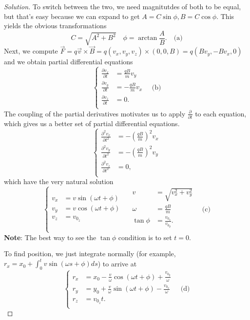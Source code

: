 \documentclass{article}
\begin{document}
\begin{proof}[Solution]
To switch between the two, we need magnitutdes of both to be equal, but
that's easy because we can expand to get $A = C\sin\phi, B = C\cos\phi$.
This yields the obvious transformations
\[\boxed{C = \sqrt{A^2 + B^2} \quad \phi = \arctan \frac{A}{B}.} \quad
\textrm{(a)} \]
Next, we compute $\vec{F} = q\vec{v} \times \vec{B} = q(v_x, v_y, v_z)
\times (0, 0, B) = q(Bv_y, -Bv_x, 0)$ and we obtain partial differential
equations
\[ \boxed{\left\lbrace \begin{aligned}
\frac{\partial v_x}{\partial t} &= \frac{qB}{m} v_y \\
\frac{\partial v_y}{\partial t} &= -\frac{qB}{m} v_x \\
\frac{\partial v_z}{\partial t} &= 0. \\
\end{aligned}\right.} \quad \textrm{(b)} \]
The coupling of the partial derivatives motivates us to apply
$\frac{\partial}{\partial t}$ to each equation, which gives us a better
set of partial differential equations.
\[ \left\lbrace \begin{aligned}
\frac{\partial^2 v_x}{\partial t^2} &= -\left(\frac{qB}{m}\right)^2 v_x
\\
\frac{\partial^2 v_y}{\partial t^2} &= -\left(\frac{qB}{m}\right)^2 v_y
\\
\frac{\partial^2 v_z}{\partial t^2} &= 0, \\
\end{aligned} \right. \]
which have the very natural solution
\[ \boxed{\left\lbrace \begin{aligned}
v_x       &= v \sin(\omega t + \phi) \\
v_y       &= v \cos(\omega t + \phi) \\
v_z       &= v_{0_z} \\
\end{aligned} \quad \begin{aligned}
v         &= \sqrt{v_x^2 + v_y^2} \\
\omega    &= \frac{qB}{m} \\
\tan \phi &= \frac{v_{0_x}}{v_{0_y}}. \\
\end{aligned} \right.} \quad \textrm{(c)} \]
\textbf{Note}: The best way to see the $\tan \phi$ condition is to set
$t = 0$.

To find position, we just integrate normally (for example, $r_x = x_0 +
\int_0^t v \sin(\omega s + \phi) ds$) to arrive at
\[ \boxed{\left\lbrace \begin{aligned}
r_x &= x_0 - \frac{v}{\omega}\cos(\omega t + \phi) +
\frac{v_{0_y}}{\omega} \\
r_y &= y_0 + \frac{v}{\omega}\sin(\omega t + \phi) -
\frac{v_{0_x}}{\omega} \\
r_z &=  v_{0_z} t. \\
\end{aligned} \right.} \quad \textrm{(d)} \]


\end{proof}
\end{document}
